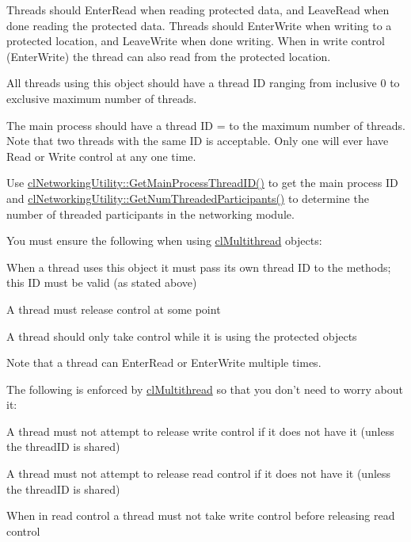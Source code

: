 Threads should EnterRead when reading protected data, and LeaveRead when done reading the protected data. Threads should EnterWrite when writing to a protected location, and LeaveWrite when done writing. When in write control (EnterWrite) the thread can also read from the protected location.\par
\par


All threads using this object should have a thread ID ranging from inclusive 0 to exclusive maximum number of threads. \par
 The main process should have a thread ID = to the maximum number of threads. Note that two threads with the same ID is acceptable. Only one will ever have Read or Write control at any one time. \par
\par


Use \hyperlink{classcl_networking_utility_acb6168b9acdc70baeb9bc0fe7c5196bb}{clNetworkingUtility::GetMainProcessThreadID()} to get the main process ID and \hyperlink{classcl_networking_utility_a19cbaaea7a9595185cb9c01bb1b438b5}{clNetworkingUtility::GetNumThreadedParticipants()} to determine the number of threaded participants in the networking module. \par
\par


You must ensure the following when using \hyperlink{classcl_multithread}{clMultithread} objects:
\begin{DoxyItemize}
\item When a thread uses this object it must pass its own thread ID to the methods; this ID must be valid (as stated above)
\item A thread must release control at some point
\item A thread should only take control while it is using the protected objects
\end{DoxyItemize}

Note that a thread can EnterRead or EnterWrite multiple times.

The following is enforced by \hyperlink{classcl_multithread}{clMultithread} so that you don't need to worry about it:
\begin{DoxyItemize}
\item A thread must not attempt to release write control if it does not have it (unless the threadID is shared)
\item A thread must not attempt to release read control if it does not have it (unless the threadID is shared)
\item When in read control a thread must not take write control before releasing read control
\end{DoxyItemize}

